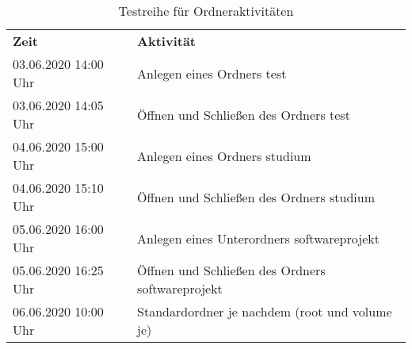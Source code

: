 \begin{longtable}{|p{}|p{}|}
	\caption{Testreihe für Ordneraktivitäten} \label{akt} \vspace{1em} \\
	\hline
	\cellcolor{gray!25}\textbf{Zeit} & \cellcolor{gray!25}\textbf{Aktivität} \\
	\hline
	03.06.2020 14:00 Uhr & Anlegen eines Ordners \glqq test\grqq{} \\
	\hline
	03.06.2020 14:05 Uhr & Öffnen und Schließen des Ordners \glqq test\grqq{} \\
	\hline
	04.06.2020 15:00 Uhr & Anlegen eines Ordners \glqq studium\grqq{} \\
	\hline
	04.06.2020 15:10 Uhr & Öffnen und Schließen des Ordners \glqq studium\grqq{} \\
	\hline
	05.06.2020 16:00 Uhr & Anlegen eines Unterordners \glqq softwareprojekt\grqq{} \\
	\hline
	05.06.2020 16:25 Uhr & Öffnen und Schließen des Ordners \glqq softwareprojekt\grqq{} \\
	\hline
	06.06.2020 10:00 Uhr & Standardordner je nachdem (root und volume je) \\
	\hline
\end{longtable}
\vspace{1em}



